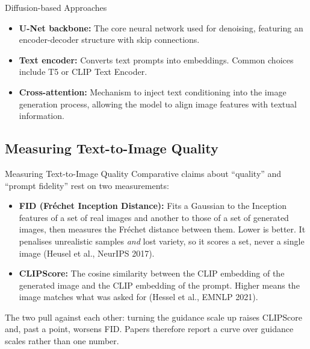 \begin{frame}[allowframebreaks]{Diffusion-based Approaches}
\begin{itemize}
        \item \textbf{U-Net backbone:} The core neural network used for denoising, featuring an encoder-decoder structure with skip connections.
        \item \textbf{Text encoder:} Converts text prompts into embeddings. Common choices include T5 or CLIP Text Encoder.
        \item \textbf{Cross-attention:} Mechanism to inject text conditioning into the image generation process, allowing the model to align image features with textual information.
    \end{itemize}
\end{frame}

\subsection{Measuring Text-to-Image Quality}
\begin{frame}{Measuring Text-to-Image Quality}
    Comparative claims about ``quality'' and ``prompt fidelity'' rest on two measurements:
    \begin{itemize}
        \item \textbf{FID (Fr\'echet Inception Distance):} Fits a Gaussian to the Inception features of a set of real images and another to those of a set of generated images, then measures the Fr\'echet distance between them. Lower is better. It penalises unrealistic samples \emph{and} lost variety, so it scores a set, never a single image (Heusel et al., NeurIPS 2017).
        \item \textbf{CLIPScore:} The cosine similarity between the CLIP embedding of the generated image and the CLIP embedding of the prompt. Higher means the image matches what was asked for (Hessel et al., EMNLP 2021).
    \end{itemize}
    \vspace{0.4em}
    The two pull against each other: turning the guidance scale up raises CLIPScore and, past a point, worsens FID. Papers therefore report a curve over guidance scales rather than one number.
\end{frame}